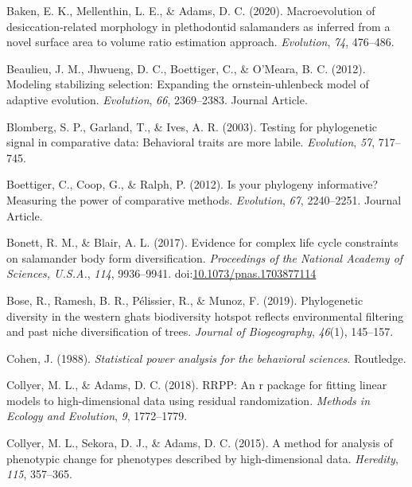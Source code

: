 \documentclass[
]{article}
\begin{document}
\leavevmode\hypertarget{ref-Baken2020}{}%
Baken, E. K., Mellenthin, L. E., \& Adams, D. C. (2020). Macroevolution
of desiccation‐related morphology in plethodontid salamanders as
inferred from a novel surface area to volume ratio estimation approach.
\emph{Evolution}, \emph{74}, 476--486.

\leavevmode\hypertarget{ref-Beaulieu_et_al2012}{}%
Beaulieu, J. M., Jhwueng, D. C., Boettiger, C., \& O'Meara, B. C.
(2012). Modeling stabilizing selection: Expanding the ornstein-uhlenbeck
model of adaptive evolution. \emph{Evolution}, \emph{66}, 2369--2383.
Journal Article.

\leavevmode\hypertarget{ref-Blomberg_et_al2003}{}%
Blomberg, S. P., Garland, T., \& Ives, A. R. (2003). Testing for
phylogenetic signal in comparative data: Behavioral traits are more
labile. \emph{Evolution}, \emph{57}, 717--745.

\leavevmode\hypertarget{ref-Boettiger_et_al2012}{}%
Boettiger, C., Coop, G., \& Ralph, P. (2012). Is your phylogeny
informative? Measuring the power of comparative methods.
\emph{Evolution}, \emph{67}, 2240--2251. Journal Article.

\leavevmode\hypertarget{ref-Bonett2017}{}%
Bonett, R. M., \& Blair, A. L. (2017). Evidence for complex life cycle
constraints on salamander body form diversification. \emph{Proceedings
of the National Academy of Sciences, U.S.A.}, \emph{114}, 9936--9941.
doi:\href{https://doi.org/10.1073/pnas.1703877114}{10.1073/pnas.1703877114}

\leavevmode\hypertarget{ref-Bose2019}{}%
Bose, R., Ramesh, B. R., Pélissier, R., \& Munoz, F. (2019).
Phylogenetic diversity in the western ghats biodiversity hotspot
reflects environmental filtering and past niche diversification of
trees. \emph{Journal of Biogeography}, \emph{46}(1), 145--157.

\leavevmode\hypertarget{ref-Cohen1988}{}%
Cohen, J. (1988). \emph{Statistical power analysis for the behavioral
sciences}. Routledge.

\leavevmode\hypertarget{ref-CollyerAdams2018}{}%
Collyer, M. L., \& Adams, D. C. (2018). RRPP: An r package for fitting
linear models to high-dimensional data using residual randomization.
\emph{Methods in Ecology and Evolution}, \emph{9}, 1772--1779.

\leavevmode\hypertarget{ref-Collyer_et_al2015a}{}%
Collyer, M. L., Sekora, D. J., \& Adams, D. C. (2015). A method for
analysis of phenotypic change for phenotypes described by
high-dimensional data. \emph{Heredity}, \emph{115}, 357--365.
\end{document}
